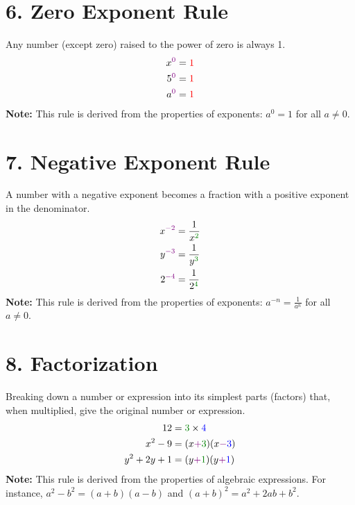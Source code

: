\documentclass[12pt]{article}
\begin{document}
\section*{6. Zero Exponent Rule}
Any number (except zero) raised to the power of zero is always 1.
\begin{align*}
    x^{{\color{operator}0}} & = {\color{alternate}1} \\
    5^{{\color{operator}0}} & = {\color{alternate}1} \\
    a^{{\color{operator}0}} & = {\color{alternate}1}
\end{align*}
\textbf{Note:} This rule is derived from the properties of exponents: \(a^0 = 1\) for all \(a \not= 0\).

\section*{7. Negative Exponent Rule}
A number with a negative exponent becomes a fraction with a positive exponent in the denominator.
\begin{align*}
    x^{{\color{operator}-2}} & = \frac{1}{x^{{\color{factorA}2}}} \\
    y^{{\color{operator}-3}} & = \frac{1}{y^{{\color{factorA}3}}} \\
    2^{{\color{operator}-4}} & = \frac{1}{2^{{\color{factorA}4}}}
\end{align*}
\textbf{Note:} This rule is derived from the properties of exponents: \(a^{-n} = \frac{1}{a^n}\) for all \(a \not= 0\).

\section*{8. Factorization}
Breaking down a number or expression into its simplest parts (factors) that, when multiplied, give the original number or expression.
\begin{align*}
    12 & = {\color{factorA}3} \times {\color{factorB}4} \\
    x^2 - 9 & = (x {\color{operator}+} {\color{factorA}3})(x {\color{operator}-} {\color{factorB}3}) \\
    y^2 + 2y + 1 & = (y {\color{operator}+} {\color{factorA}1})(y {\color{operator}+} {\color{factorB}1})
\end{align*}
\textbf{Note:} This rule is derived from the properties of algebraic expressions. For instance, \(a^2 - b^2 = (a+b)(a-b)\) and \((a+b)^2 = a^2 + 2ab + b^2\).


\newpage
\end{document}

